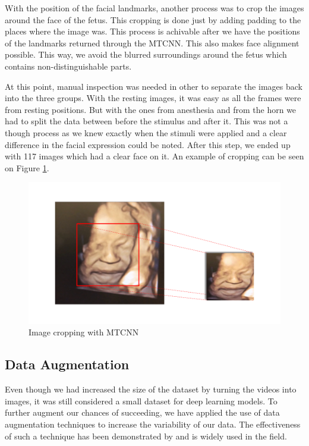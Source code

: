 With the position of the facial landmarks, another process was to crop the images around the face of the fetus. This cropping is done just by adding padding to the places where the image was. This process is achivable after we have the positions of the landmarks returned through the MTCNN. This also makes face alignment possible. This way, we avoid the blurred surroundings around the fetus which contains non-distinguishable parts. 

At this point, manual inspection was needed in other to separate the images back into the three groups. With the resting images, it was easy as all the frames were from resting positions. But with the ones from anesthesia and from the horn we had to split the data between before the stimulus and after it. This was not a though process as we knew exactly when the stimuli were applied and a clear difference in the facial expression could be noted. After this step, we ended up with 117 images which had a clear face on it. An example of cropping can be seen on Figure \ref{fig:cropping}.

\begin{figure}[h!tp]
    \centering
    \includegraphics[width=.9\textwidth]{imgs/chap3_cropping.png}
    \caption{Image cropping with MTCNN}
    \label{fig:cropping}
\end{figure}

\subsection{Data Augmentation}

Even though we had increased the size of the dataset by turning the videos into images, it was still considered a small dataset for deep learning models. To further augment our chances of succeeding, we have applied the use of data augmentation techniques to increase the variability of our data. The effectiveness of such a technique has been demonstrated by \cite{abs-1712-04621} and is widely used in the field.

